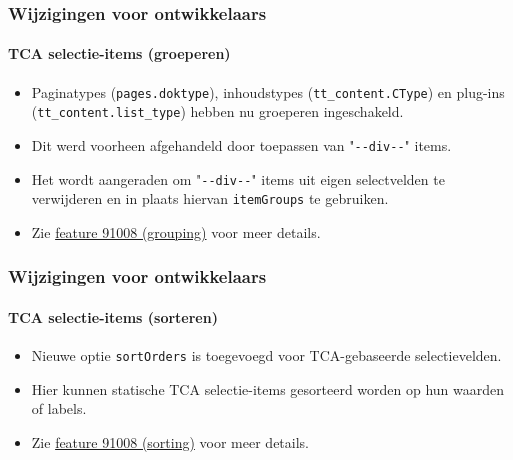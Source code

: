 
\begin{frame}[fragile]
	\frametitle{Wijzigingen voor ontwikkelaars}
	\framesubtitle{TCA selectie-items (groeperen)}

	\begin{itemize}
		\item Paginatypes (\texttt{pages.doktype}), inhoudstypes (\texttt{tt\_content.CType})
			en plug-ins (\texttt{tt\_content.list\_type}) hebben nu groeperen ingeschakeld.
		\item Dit werd voorheen afgehandeld door toepassen van
			"\texttt{-}\texttt{-div-}\texttt{-}" items.
		\item Het wordt aangeraden om "\texttt{-}\texttt{-div-}\texttt{-}" items
			uit eigen selectvelden te verwijderen en in plaats hiervan \texttt{itemGroups} te gebruiken.
		\item Zie
			\href{https://docs.typo3.org/c/typo3/cms-core/master/en-us/Changelog/10.4/Feature-91008-ItemGroupingForTCASelectItems.html}{feature 91008 (grouping)}
			voor meer details.
	\end{itemize}

\end{frame}


\begin{frame}[fragile]
	\frametitle{Wijzigingen voor ontwikkelaars}
	\framesubtitle{TCA selectie-items (sorteren)}

	\begin{itemize}
		\item Nieuwe optie \texttt{sortOrders} is toegevoegd voor TCA-gebaseerde selectievelden.
		\item Hier kunnen statische TCA selectie-items gesorteerd worden op hun waarden of labels.
		\item Zie
			\href{https://docs.typo3.org/c/typo3/cms-core/master/en-us/Changelog/10.4/Feature-91008-ItemSortingForTCASelectItems.html}{feature 91008 (sorting)}
			voor meer details.
	\end{itemize}

\end{frame}



